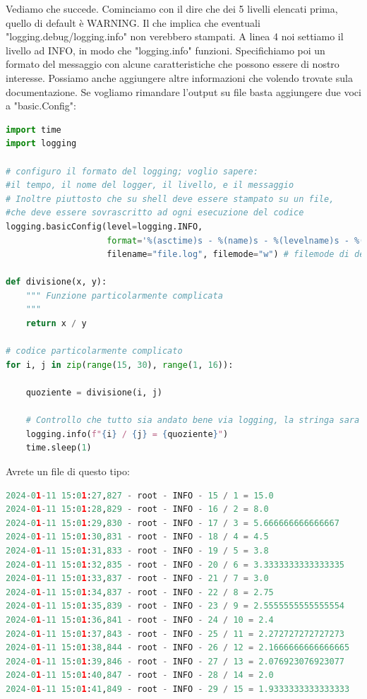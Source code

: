 \documentclass[10pt,a4paper]{article}
\begin{document}
Vediamo che succede. Cominciamo con il dire che dei 5 livelli elencati prima, quello di default è WARNING. Il che implica che eventuali "logging.debug/logging.info" non verebbero stampati. A linea 4 noi settiamo il livello ad INFO, in modo che "logging.info" funzioni. Specifichiamo poi un formato del messaggio con alcune caratteristiche che possono essere di nostro interesse. Possiamo anche aggiungere altre informazioni che volendo trovate sula documentazione. Se vogliamo rimandare l'output su file basta aggiungere due voci a "basic.Config":  
\begin{lstlisting}[language=Python]
import time
import logging

# configuro il formato del logging; voglio sapere:
#il tempo, il nome del logger, il livello, e il messaggio
# Inoltre piuttosto che su shell deve essere stampato su un file,
#che deve essere sovrascritto ad ogni esecuzione del codice
logging.basicConfig(level=logging.INFO, 
                    format='%(asctime)s - %(name)s - %(levelname)s - %(message)s', 
                    filename="file.log", filemode="w") # filemode di default e' a (append)

def divisione(x, y):
    """ Funzione particolarmente complicata
    """
    return x / y

# codice particolarmente complicato
for i, j in zip(range(15, 30), range(1, 16)):

    quoziente = divisione(i, j)

    # Controllo che tutto sia andato bene via logging, la stringa sara' il messaggio
    logging.info(f"{i} / {j} = {quoziente}")
    time.sleep(1)
\end{lstlisting}
Avrete un file di questo tipo:
\begin{lstlisting}[language=Python]
2024-01-11 15:01:27,827 - root - INFO - 15 / 1 = 15.0
2024-01-11 15:01:28,829 - root - INFO - 16 / 2 = 8.0
2024-01-11 15:01:29,830 - root - INFO - 17 / 3 = 5.666666666666667
2024-01-11 15:01:30,831 - root - INFO - 18 / 4 = 4.5
2024-01-11 15:01:31,833 - root - INFO - 19 / 5 = 3.8
2024-01-11 15:01:32,835 - root - INFO - 20 / 6 = 3.3333333333333335
2024-01-11 15:01:33,837 - root - INFO - 21 / 7 = 3.0
2024-01-11 15:01:34,837 - root - INFO - 22 / 8 = 2.75
2024-01-11 15:01:35,839 - root - INFO - 23 / 9 = 2.5555555555555554
2024-01-11 15:01:36,841 - root - INFO - 24 / 10 = 2.4
2024-01-11 15:01:37,843 - root - INFO - 25 / 11 = 2.272727272727273
2024-01-11 15:01:38,844 - root - INFO - 26 / 12 = 2.1666666666666665
2024-01-11 15:01:39,846 - root - INFO - 27 / 13 = 2.076923076923077
2024-01-11 15:01:40,847 - root - INFO - 28 / 14 = 2.0
2024-01-11 15:01:41,849 - root - INFO - 29 / 15 = 1.9333333333333333
\end{lstlisting}
\end{document}
